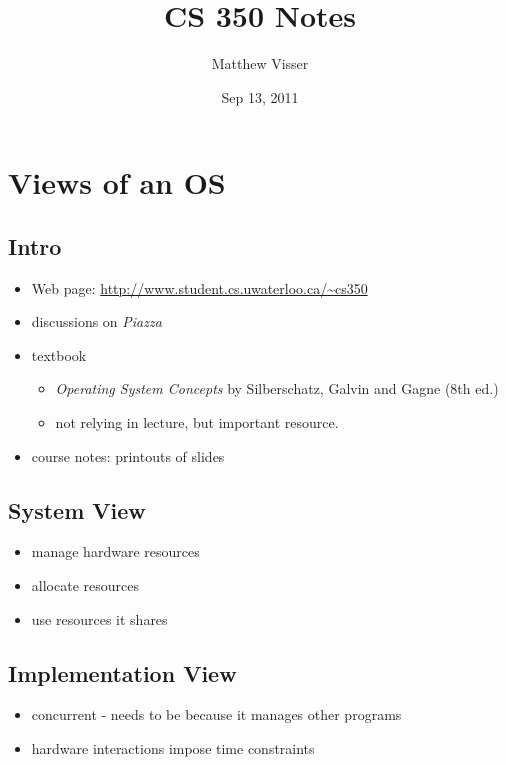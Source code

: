 \documentclass[12pt]{article}
\begin{document}
\title{CS 350 Notes}
\author{Matthew Visser}
\date{Sep 13, 2011}
\maketitle

\section*{Views of an OS}

\subsection{Intro}

\begin{itemize}
    \item Web page: \url{http://www.student.cs.uwaterloo.ca/~cs350}
    \item discussions on \textit{Piazza}
    \item textbook
        \begin{itemize}
            \item \textit{Operating System Concepts} by Silberschatz, Galvin and
                Gagne (8th ed.)
            \item not relying in lecture, but important resource.
        \end{itemize}
    \item course notes: printouts of slides
\end{itemize}

\subsection{System View}

\begin{itemize}
    \item manage hardware resources
    \item allocate resources
    \item use resources it shares
\end{itemize}

\subsection{Implementation View}

\begin{itemize}
    \item concurrent - needs to be because it manages other programs
    \item hardware interactions impose time constraints
\end{itemize}
\end{document}
